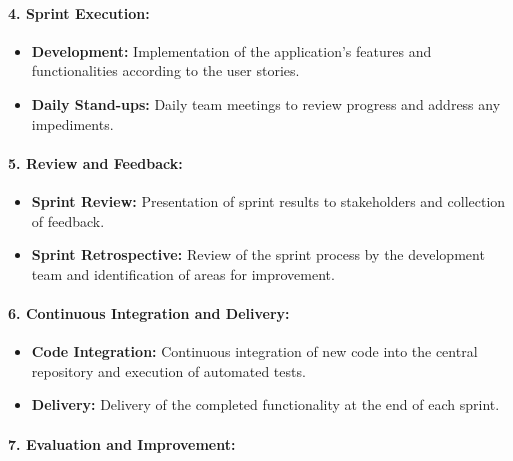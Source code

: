\documentclass[unnumsec,webpdf,contemporary,large]{oup-authoring-template}%
\theoremstyle{thmstyleone}%
\theoremstyle{thmstyletwo}%
\theoremstyle{thmstylethree}%
\begin{document}
\paragraph{4. Sprint Execution:}
\vspace{0.2cm}

\begin{itemize}
    \item \textbf{Development:} Implementation of the application's features and functionalities according to the user stories.
    \vspace{0.1cm}
    \item \textbf{Daily Stand-ups:} Daily team meetings to review progress and address any impediments.
\end{itemize}
\vspace{0.1cm}

\paragraph{5. Review and Feedback:}
\vspace{0.2cm}

\begin{itemize}
    \item \textbf{Sprint Review:} Presentation of sprint results to stakeholders and collection of feedback.
    \vspace{0.1cm}
    \item \textbf{Sprint Retrospective:} Review of the sprint process by the development team and identification of areas for improvement.
\end{itemize}
\vspace{0.1cm}

\paragraph{6. Continuous Integration and Delivery:}
\vspace{0.2cm}

\begin{itemize}
    \item \textbf{Code Integration:} Continuous integration of new code into the central repository and execution of automated tests.
    \item \textbf{Delivery:} Delivery of the completed functionality at the end of each sprint.
\end{itemize}
\vspace{0.1cm}

\paragraph{7. Evaluation and Improvement:}
\vspace{0.2cm}
\end{document}

